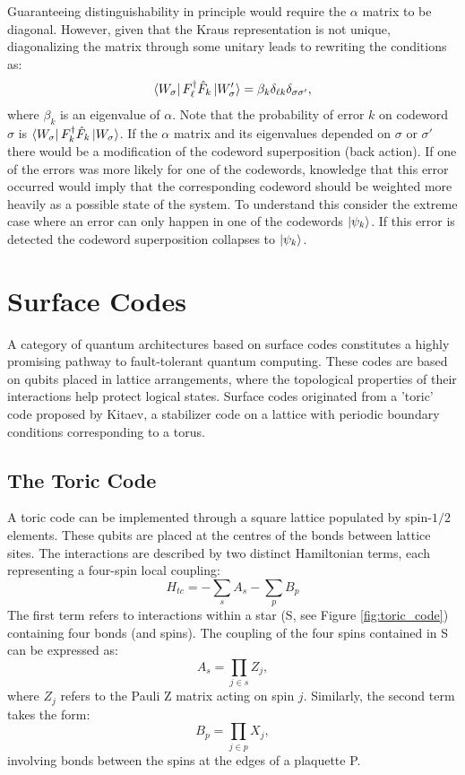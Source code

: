 Guaranteeing distinguishability in principle would require the $\alpha$ matrix to be diagonal. However, given that the Kraus representation is not unique, diagonalizing the matrix through some unitary leads to rewriting the conditions as:
\begin{equation}
    \bra{W_\sigma}  F_\ell^\dagger\hat F_k \ket{W_\sigma'}= \beta_k\delta_{\ell k}\delta_{\sigma\sigma'},
\end{equation}
where $\beta_k$ is an eigenvalue of $\alpha$. Note that the probability of error $k$ on codeword $\sigma$ is $\bra{W_\sigma}  F_k^\dagger\hat F_k \ket{W_\sigma}$. If the $\alpha$ matrix and its eigenvalues depended on $\sigma$ or $\sigma'$ there would be a modification of the codeword superposition (back action). If one of the errors was more likely for one of the codewords, knowledge that this error occurred would imply that the corresponding codeword should be weighted more heavily as a possible state of the system. To understand this consider the extreme case where an error can only happen in one of the codewords $\ket{\psi_k}$. If this error is detected the codeword superposition collapses to $\ket{\psi_k}$.

\section{Surface Codes}

A category of quantum architectures based on surface codes constitutes a highly promising pathway to fault-tolerant quantum computing. These codes are based on qubits placed in lattice arrangements, where the topological properties of their interactions help protect logical states. Surface codes originated from a 'toric' code proposed by Kitaev, a stabilizer code on a lattice with periodic boundary conditions corresponding to a torus.

\subsection{The Toric Code}

A toric code\cite{Girvin2021,Herringer2020} can be implemented through a square lattice populated by spin-$1/2$ elements. These qubits are placed at the centres of the bonds between lattice sites. The interactions are described by two distinct Hamiltonian terms, each representing a four-spin local coupling:
\begin{equation}
    H_{tc}=-\sum_s A_s -\sum_p B_p
\end{equation}
The first term refers to interactions within a star (S, see Figure \ref{fig:toric_code}) containing four bonds (and spins). The coupling of the four spins contained in S can be expressed as:
\begin{equation}
    A_s=\prod_{j\in s} Z_j,
\end{equation}
where $Z_j$ refers to the Pauli Z matrix acting on spin $j$. Similarly, the second term takes the form:
\begin{equation}
    B_p=\prod_{j\in p} X_j,
\end{equation}
involving bonds between the spins at the edges of a plaquette P.

